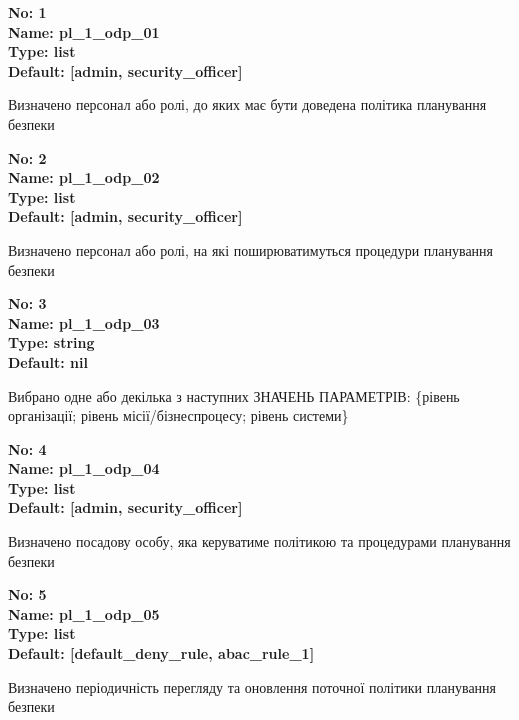 \documentclass{article}
\begin{document}
\vspace{10pt}
{\footnotesize\bfseries
No: 1\\
Name: pl\_\allowbreak{}1\_\allowbreak{}odp\_\allowbreak{}01\\
Type: list\\
Default: [\textquotedbl{}admin\textquotedbl{}, \textquotedbl{}security\_\allowbreak{}officer\textquotedbl{}]
}

{\footnotesize Визначено персонал або ролі, до яких має бути доведена політика планування безпеки}


{\footnotesize\bfseries
No: 2\\
Name: pl\_\allowbreak{}1\_\allowbreak{}odp\_\allowbreak{}02\\
Type: list\\
Default: [\textquotedbl{}admin\textquotedbl{}, \textquotedbl{}security\_\allowbreak{}officer\textquotedbl{}]
}

{\footnotesize Визначено персонал або ролі, на які поширюватимуться процедури планування безпеки}


{\footnotesize\bfseries
No: 3\\
Name: pl\_\allowbreak{}1\_\allowbreak{}odp\_\allowbreak{}03\\
Type: string\\
Default: nil
}

{\footnotesize Вибрано одне або декілька з наступних ЗНАЧЕНЬ ПАРАМЕТРІВ: \{рівень організації; рівень місії/бізнеспроцесу; рівень системи\}}


{\footnotesize\bfseries
No: 4\\
Name: pl\_\allowbreak{}1\_\allowbreak{}odp\_\allowbreak{}04\\
Type: list\\
Default: [\textquotedbl{}admin\textquotedbl{}, \textquotedbl{}security\_\allowbreak{}officer\textquotedbl{}]
}

{\footnotesize Визначено посадову особу, яка керуватиме політикою та процедурами планування безпеки}


{\footnotesize\bfseries
No: 5\\
Name: pl\_\allowbreak{}1\_\allowbreak{}odp\_\allowbreak{}05\\
Type: list\\
Default: [\textquotedbl{}default\_\allowbreak{}deny\_\allowbreak{}rule\textquotedbl{}, \textquotedbl{}abac\_\allowbreak{}rule\_\allowbreak{}1\textquotedbl{}]
}

{\footnotesize Визначено періодичність перегляду та оновлення поточної політики планування безпеки}
\end{document}
